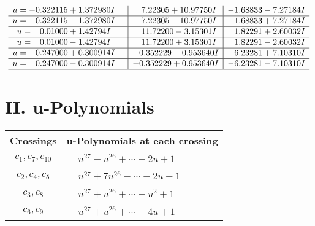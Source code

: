 \documentclass[1p]{elsarticle_modified}
\theoremstyle{definition}
\begin{document}
$$\begin{array}{c|c|c}
\begin{aligned}
u &= -0.322115 + 1.372980 I\end{aligned}
 & \phantom{-}7.22305 + 10.97750 I & -1.68833 - 7.27184 I \\ \hline\begin{aligned}
u &= -0.322115 - 1.372980 I\end{aligned}
 & \phantom{-}7.22305 - 10.97750 I & -1.68833 + 7.27184 I \\ \hline\begin{aligned}
u &= \phantom{-}0.01000 + 1.42794 I\end{aligned}
 & \phantom{-}11.72200 - 3.15301 I & \phantom{-}1.82291 + 2.60032 I \\ \hline\begin{aligned}
u &= \phantom{-}0.01000 - 1.42794 I\end{aligned}
 & \phantom{-}11.72200 + 3.15301 I & \phantom{-}1.82291 - 2.60032 I \\ \hline\begin{aligned}
u &= \phantom{-}0.247000 + 0.300914 I\end{aligned}
 & -0.352229 - 0.953640 I & -6.23281 + 7.10310 I \\ \hline\begin{aligned}
u &= \phantom{-}0.247000 - 0.300914 I\end{aligned}
 & -0.352229 + 0.953640 I & -6.23281 - 7.10310 I\\
 \hline 
 \end{array}$$\newpage
\newpage\renewcommand{\arraystretch}{1}
\centering \section*{ II. u-Polynomials}
\begin{tabular}{m{50pt}|m{274pt}}
Crossings & \hspace{64pt}u-Polynomials at each crossing \\
\hline $$\begin{aligned}c_{1},c_{7},c_{10}\end{aligned}$$&$\begin{aligned}
&u^{27}- u^{26}+\cdots+2 u+1
\end{aligned}$\\
\hline $$\begin{aligned}c_{2},c_{4},c_{5}\end{aligned}$$&$\begin{aligned}
&u^{27}+7 u^{26}+\cdots-2 u-1
\end{aligned}$\\
\hline $$\begin{aligned}c_{3},c_{8}\end{aligned}$$&$\begin{aligned}
&u^{27}+u^{26}+\cdots+u^2+1
\end{aligned}$\\
\hline $$\begin{aligned}c_{6},c_{9}\end{aligned}$$&$\begin{aligned}
&u^{27}+u^{26}+\cdots+4 u+1
\end{aligned}$\\
\hline
\end{tabular}\newpage\renewcommand{\arraystretch}{1}
\end{document}
